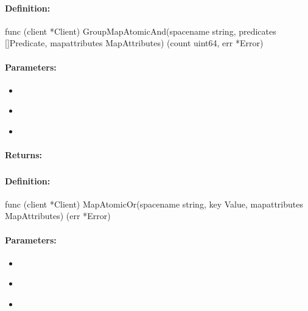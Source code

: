 \paragraph{Definition:}
\begin{gocode}
func (client *Client) GroupMapAtomicAnd(spacename string, predicates []Predicate, mapattributes MapAttributes) (count uint64, err *Error)
\end{gocode}

\paragraph{Parameters:}
\begin{itemize}[noitemsep]
\item {}\\

\item {}\\

\item {}\\

\end{itemize}

\paragraph{Returns:}


\pagebreak
\subsubsection{}
\label{api:Go:MapAtomicOr}


\paragraph{Definition:}
\begin{gocode}
func (client *Client) MapAtomicOr(spacename string, key Value, mapattributes MapAttributes) (err *Error)
\end{gocode}

\paragraph{Parameters:}
\begin{itemize}[noitemsep]
\item {}\\

\item {}\\

\item {}\\

\end{itemize}

